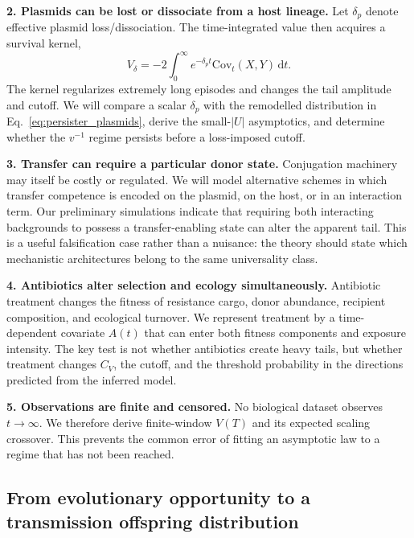 \documentclass[12pt,a4paper]{article}
\newcommand{\Cov}{\mathrm{Cov}}
\newcommand{\dd}{\,\mathrm{d}}
\begin{document}
\textbf{2. Plasmids can be lost or dissociate from a host lineage.} Let $\delta_p$ denote effective plasmid loss/dissociation. The time-integrated value then acquires a survival kernel,
\begin{equation}
V_{\delta}= -2\int_0^{\infty}e^{-\delta_p t}\Cov_t(X,Y)\dd t.
\label{eq:discount}
\end{equation}
The kernel regularizes extremely long episodes and changes the tail amplitude and cutoff. We will compare a scalar $\delta_p$ with the remodelled distribution in Eq.~\eqref{eq:persister_plasmids}, derive the small-$|U|$ asymptotics, and determine whether the $v^{-1}$ regime persists before a loss-imposed cutoff.

\textbf{3. Transfer can require a particular donor state.} Conjugation machinery may itself be costly or regulated. We will model alternative schemes in which transfer competence is encoded on the plasmid, on the host, or in an interaction term. Our preliminary simulations indicate that requiring both interacting backgrounds to possess a transfer-enabling state can alter the apparent tail. This is a useful falsification case rather than a nuisance: the theory should state which mechanistic architectures belong to the same universality class.

\textbf{4. Antibiotics alter selection and ecology simultaneously.} Antibiotic treatment changes the fitness of resistance cargo, donor abundance, recipient composition, and ecological turnover. We represent treatment by a time-dependent covariate $A(t)$ that can enter both fitness components and exposure intensity. The key test is not whether antibiotics create heavy tails, but whether treatment changes $C_V$, the cutoff, and the threshold probability in the directions predicted from the inferred model.

\textbf{5. Observations are finite and censored.} No biological dataset observes $t\to\infty$. We therefore derive finite-window $V(T)$ and its expected scaling crossover. This prevents the common error of fitting an asymptotic law to a regime that has not been reached.

\subsection{From evolutionary opportunity to a transmission offspring distribution}
\end{document}
